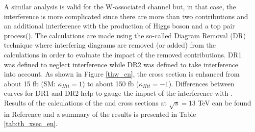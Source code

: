 A similar analysis is valid for the W-associated channel but, in that case, the interference is more complicated since there are more than two contributions and an additional interference with the production of Higgs boson and a top pair process(\ttH). The calculations are made using the so-called Diagram Removal (DR) technique where interfering diagrams are removed (or added) from the calculations in order to evaluate the impact of the removed contributions. DR1 was defined to neglect \ttH interference while DR2 was defined to take \ttH interference into account\cite{demartin}. As shown in Figure \ref{thw_en}, the \tHW cross section is enhanced from about 15 fb (SM: $\kappa_{Htt}=1$) to about 150 fb ($\kappa_{Htt}=-1$). Differences between curves for DR1 and DR2 help to gauge the impact of the interference with \ttH.     
Results of the calculations of the \tHq and \tHW cross sections at $\sqrt{s}=13$ TeV can be found in Reference \cite{yellow} and a summary of the results is presented in Table \ref{tab:th_xsec_en}.
